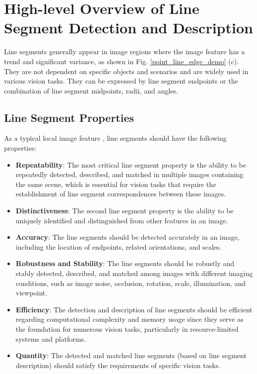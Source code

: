 \documentclass[journal,compsoc]{IEEEtran}
\begin{document}
\section{High-level Overview of Line Segment Detection and Description}
\label{sec_high_level_overview}
Line segments generally appear in image regions where the image feature has a trend and significant variance, as shown in Fig. \ref{point_line_edge_demo} (c). They are not dependent on specific objects and scenarios and are widely used in various vision tasks. They can be expressed by line segment endpoints or the combination of line segment midpoints, radii, and angles.

\subsection{Line Segment Properties}
\label{subsec_ls_properties}
As a typical local image feature \cite{local_feature}, line segments should have the following properties:
\begin{itemize}
	\item \textbf{Repeatability}: The most critical line segment property is the ability to be repeatedly detected, described, and matched in multiple images containing the same scene, which is essential for vision tasks that require the establishment of line segment correspondences between these images.
	
	\item \textbf{Distinctiveness}: The second line segment property is the ability to be uniquely identified and distinguished from other features in an image.
	
	\item \textbf{Accuracy}: The line segments should be detected accurately in an image, including the location of endpoints, related orientations, and scales.
	
	\item \textbf{Robustness and Stability}: The line segments should be robustly and stably detected, described, and matched among images with different imaging conditions, such as image noise, occlusion, rotation, scale, illumination, and viewpoint.
	
	\item \textbf{Efficiency}: The detection and description of line segments should be efficient regarding computational complexity and memory usage since they serve as the foundation for numerous vision tasks, particularly in resource-limited systems and platforms.
	
	\item \textbf{Quantity}: The detected and matched line segments (based on line segment description) should satisfy the requirements of specific vision tasks.
\end{itemize}
\end{document}
